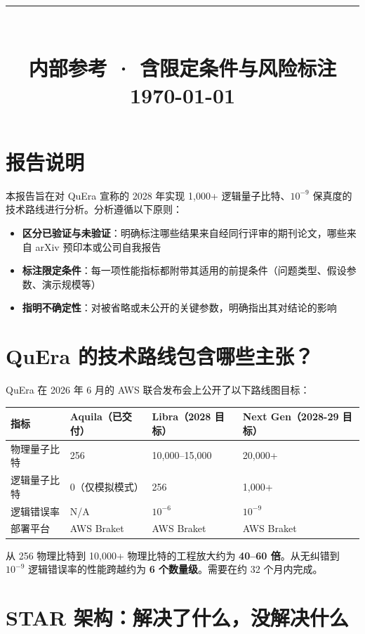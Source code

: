 \documentclass[11pt,a4paper]{ctexart}
\title{\vspace{2cm}{\Huge\bfseries\color{mainred} QuEra 2028 年容错量子计算\\[6pt]技术路线分析}\\[16pt]\rule{0.5\textwidth}{1.5pt}\\[12pt]{\large\color{graytext}内部参考 · 含限定条件与风险标注}\\[16pt]{\footnotesize\color{graytext}\today}}
\date{}
\begin{document}
\maketitle\thispagestyle{empty}
\newpage

\section{报告说明}

本报告旨在对 QuEra 宣称的 2028 年实现 1,000+ 逻辑量子比特、$10^{-9}$ 保真度的技术路线进行分析。分析遵循以下原则：

\begin{itemize}
\item \textbf{区分已验证与未验证}：明确标注哪些结果来自经同行评审的期刊论文，哪些来自 arXiv 预印本或公司自我报告
\item \textbf{标注限定条件}：每一项性能指标都附带其适用的前提条件（问题类型、假设参数、演示规模等）
\item \textbf{指明不确定性}：对被省略或未公开的关键参数，明确指出其对结论的影响
\end{itemize}

\section{QuEra 的技术路线包含哪些主张？}

QuEra 在 2026 年 6 月的 AWS 联合发布会上公开了以下路线图目标：

\begin{center}
\begin{tabular}{p{3cm}p{3.5cm}p{3.5cm}p{3.5cm}}
\toprule
\textbf{指标} & \textbf{Aquila（已交付）} & \textbf{Libra（2028 目标）} & \textbf{Next Gen（2028-29 目标）} \\
\midrule
物理量子比特 & 256 & 10,000--15,000 & 20,000+ \\
逻辑量子比特 & 0（仅模拟模式） & 256 & 1,000+ \\
逻辑错误率 & N/A & $10^{-6}$ & $10^{-9}$ \\
部署平台 & AWS Braket & AWS Braket & AWS Braket \\
\bottomrule
\end{tabular}
\end{center}

从 256 物理比特到 10,000+ 物理比特的工程放大约为 \textbf{40--60 倍}。从无纠错到 $10^{-9}$ 逻辑错误率的性能跨越约为 \textbf{6 个数量级}。需要在约 32 个月内完成。

\section{STAR 架构：解决了什么，没解决什么}
\end{document}
